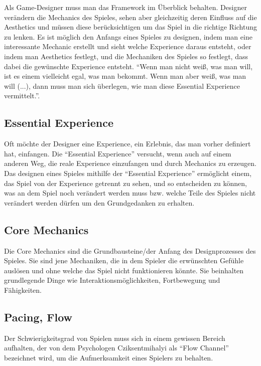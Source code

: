 \noindent Als Game-Designer muss man das Framework im Überblick behalten. Designer verändern die Mechanics des Spieles, sehen aber gleichzeitig deren Einfluss auf die Aesthetics und müssen diese berücksichtigen um das Spiel in die richtige Richtung zu lenken. Es ist möglich den Anfangs eines Spieles zu designen, indem man eine interessante Mechanic erstellt und sieht welche Experience daraus entsteht, oder indem man Aesthetics festlegt, und die Mechaniken des Spieles so festlegt, dass dabei die gewünschte Experience entsteht. "`Wenn man nicht weiß, was man will, ist es einem vielleicht egal, was man bekommt. Wenn man aber weiß, was man will (...), dann muss man sich überlegen, wie man diese Essential Experience vermittelt."'\cite[S.55]{_art_of_gamedesign}.

\subsection{Essential Experience}

Oft möchte der Designer eine Experience, ein Erlebnis, das man vorher definiert hat, einfangen. Die "`Essential Experience"' versucht, wenn auch auf einem anderen Weg, die reale Experience einzufangen und durch Mechanics zu erzeugen. Das designen eines Spieles mithilfe der "`Essential Experience"' ermöglicht einem, das Spiel von der Experience getrennt zu sehen, und so entscheiden zu können, was an dem Spiel noch verändert werden muss bzw. welche Teile des Spieles nicht verändert werden dürfen um den Grundgedanken zu erhalten\cite[S.55]{_art_of_gamedesign}.

\subsection{Core Mechanics}

Die Core Mechanics sind die Grundbausteine/der Anfang des Designprozesses des Spieles. Sie sind jene Mechaniken, die in dem Spieler die erwünschten Gefühle auslösen und ohne welche das Spiel nicht funktionieren könnte. Sie beinhalten grundlegende Dinge wie Interaktionsmöglichkeiten, Fortbewegung und Fähigkeiten.

\subsection{Pacing, Flow\label{_flow}}

Der Schwierigkeitsgrad von Spielen muss sich in einem gewissen Bereich aufhalten, der von dem Psychologen Cziksentmihalyi als "`Flow Channel"' bezeichnet wird, um die Aufmerksamkeit eines Spielers zu behalten\cite[S.205]{_art_of_gamedesign}.

